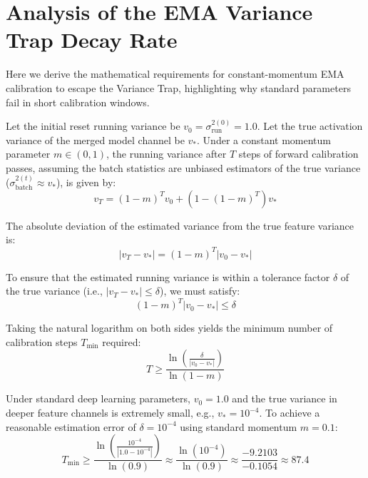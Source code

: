 \documentclass{article}
\theoremstyle{plain}
\theoremstyle{definition}
\theoremstyle{remark}
\begin{document}
\section{Analysis of the EMA Variance Trap Decay Rate}
\label{ap:trap_decay}
Here we derive the mathematical requirements for constant-momentum EMA calibration to escape the Variance Trap, highlighting why standard parameters fail in short calibration windows.

Let the initial reset running variance be $v_0 = \sigma^{2 (0)}_{\text{run}} = 1.0$. Let the true activation variance of the merged model channel be $v_*$. Under a constant momentum parameter $m \in (0, 1)$, the running variance after $T$ steps of forward calibration passes, assuming the batch statistics are unbiased estimators of the true variance ($\sigma^{2 (t)}_{\text{batch}} \approx v_*$), is given by:
\begin{equation}
    v_T = (1 - m)^T v_0 + \left( 1 - (1 - m)^T \right) v_*
\end{equation}

The absolute deviation of the estimated variance from the true feature variance is:
\begin{equation}
    |v_T - v_*| = (1 - m)^T |v_0 - v_*|
\end{equation}

To ensure that the estimated running variance is within a tolerance factor $\delta$ of the true variance (i.e., $|v_T - v_*| \le \delta$), we must satisfy:
\begin{equation}
    (1 - m)^T |v_0 - v_*| \le \delta
\end{equation}

Taking the natural logarithm on both sides yields the minimum number of calibration steps $T_{\text{min}}$ required:
\begin{equation}
    T \ge \frac{\ln \left( \frac{\delta}{|v_0 - v_*|} \right)}{\ln(1 - m)}
\end{equation}

Under standard deep learning parameters, $v_0 = 1.0$ and the true variance in deeper feature channels is extremely small, e.g., $v_* = 10^{-4}$. To achieve a reasonable estimation error of $\delta = 10^{-4}$ using standard momentum $m = 0.1$:
\begin{equation}
    T_{\text{min}} \ge \frac{\ln \left( \frac{10^{-4}}{|1.0 - 10^{-4}|} \right)}{\ln(0.9)} \approx \frac{\ln(10^{-4})}{\ln(0.9)} \approx \frac{-9.2103}{-0.1054} \approx 87.4
\end{equation}
\end{document}
